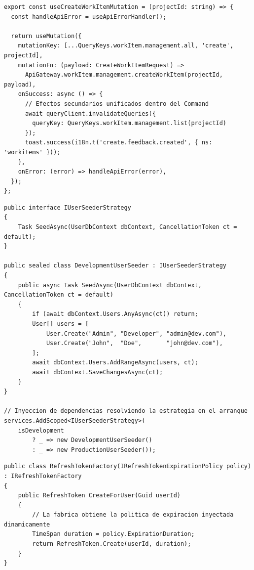 \begin{lstlisting}[float=htbp, style=TypeScript, caption={El patrón Command encapsulando operaciones de escritura en React Query.}, label={lst:command_frontend}]
export const useCreateWorkItemMutation = (projectId: string) => {
  const handleApiError = useApiErrorHandler();

  return useMutation({
    mutationKey: [...QueryKeys.workItem.management.all, 'create', projectId],
    mutationFn: (payload: CreateWorkItemRequest) =>
      ApiGateway.workItem.management.createWorkItem(projectId, payload),
    onSuccess: async () => {
      // Efectos secundarios unificados dentro del Command
      await queryClient.invalidateQueries({ 
        queryKey: QueryKeys.workItem.management.list(projectId) 
      });
      toast.success(i18n.t('create.feedback.created', { ns: 'workitems' }));
    },
    onError: (error) => handleApiError(error),
  });
};
\end{lstlisting}

\begin{lstlisting}[float=htbp, style=CSharp, caption={Implementación de Strategy para la inyección de datos iniciales.}, label={lst:strategy_pattern}]
public interface IUserSeederStrategy
{
    Task SeedAsync(UserDbContext dbContext, CancellationToken ct = default);
}

public sealed class DevelopmentUserSeeder : IUserSeederStrategy
{
    public async Task SeedAsync(UserDbContext dbContext, CancellationToken ct = default)
    {
        if (await dbContext.Users.AnyAsync(ct)) return;
        User[] users = [
            User.Create("Admin", "Developer", "admin@dev.com"),
            User.Create("John",  "Doe",       "john@dev.com"),
        ];
        await dbContext.Users.AddRangeAsync(users, ct);
        await dbContext.SaveChangesAsync(ct);
    }
}

// Inyeccion de dependencias resolviendo la estrategia en el arranque
services.AddScoped<IUserSeederStrategy>(
    isDevelopment 
        ? _ => new DevelopmentUserSeeder() 
        : _ => new ProductionUserSeeder());
\end{lstlisting}

\begin{lstlisting}[float=htbp, style=CSharp, caption={Implementación del patrón Factory delegando logicas de expiracion.}, label={lst:factory_token}]
public class RefreshTokenFactory(IRefreshTokenExpirationPolicy policy) : IRefreshTokenFactory
{
    public RefreshToken CreateForUser(Guid userId)
    {
        // La fabrica obtiene la politica de expiracion inyectada dinamicamente
        TimeSpan duration = policy.ExpirationDuration;
        return RefreshToken.Create(userId, duration);
    }
}
\end{lstlisting}

